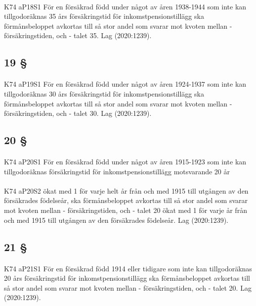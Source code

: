 \documentclass[a4paper,notitlepage,openany,10pt]{book}
\begin{document}
\paragraph*{}
{\tiny K74 aP18S1}
För en försäkrad född under något av åren 1938-1944 som inte kan tillgodoräknas 35 års försäkringstid för inkomstpensionstillägg ska förmånsbeloppet avkortas till så stor andel som svarar mot kvoten mellan
\newline - försäkringstiden, och
\newline - talet 35.
Lag (2020:1239).
\subsection*{19 §}
\paragraph*{}
{\tiny K74 aP19S1}
För en försäkrad född under något av åren 1924-1937 som inte kan tillgodoräknas 30 års försäkringstid för inkomstpensionstillägg ska förmånsbeloppet avkortas till så stor andel som svarar mot kvoten mellan
\newline - försäkringstiden, och
\newline - talet 30.
Lag (2020:1239).
\subsection*{20 §}
\paragraph*{}
{\tiny K74 aP20S1}
För en försäkrad född under något av åren 1915-1923 som inte kan tillgodoräknas försäkringstid för inkomstpensionstillägg motsvarande 20 år
\paragraph*{}
{\tiny K74 aP20S2}
ökat med 1 för varje helt år från och med 1915 till utgången av den försäkrades födelseår, ska förmånsbeloppet avkortas till så stor andel som svarar mot kvoten mellan
\newline - försäkringstiden, och
\newline - talet 20 ökat med 1 för varje år från och med 1915 till utgången av den försäkrades födelseår.
Lag (2020:1239).
\subsection*{21 §}
\paragraph*{}
{\tiny K74 aP21S1}
För en försäkrad född 1914 eller tidigare som inte kan tillgodoräknas 20 års försäkringstid för inkomstpensionstillägg ska förmånsbeloppet avkortas till så stor andel som svarar mot kvoten mellan
\newline - försäkringstiden, och
\newline - talet 20.
Lag (2020:1239).
\end{document}
